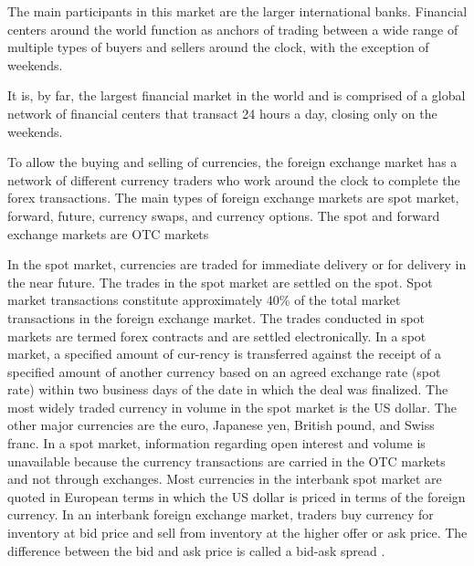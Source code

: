 The main participants in this market are the larger international banks. Financial centers around the world function as anchors of trading between a wide range of multiple types of buyers and sellers around the clock, with the exception of weekends.

It is, by far, the largest financial market in the world and is comprised of a global network of financial centers that transact 24 hours a day, closing only on the weekends.

To allow the buying and selling of currencies, the foreign exchange market has a network of different currency  traders  who  work  around  the  clock  to  complete  the  forex  transactions.  The  main  types  of  foreign exchange markets are spot market, forward, future, currency swaps, and currency options. The spot and forward exchange markets are OTC markets

In the spot market, currencies are traded for immediate delivery or for delivery in the near future. The trades in the spot market are settled on the spot. Spot market transactions constitute approximately 40\% of the total market transactions in the foreign exchange market. The trades conducted in spot markets are termed forex contracts and are settled electronically. In a spot market, a specified amount of cur-rency is transferred against the receipt of a specified amount of another currency based on an agreed exchange rate (spot rate) within two business days of the date in which the deal was finalized. The most widely traded currency in volume in the spot market is the US dollar. The other major currencies are the euro, Japanese yen, British pound, and Swiss franc. In a spot market, information regarding open interest and volume is unavailable because the currency transactions are carried in the OTC markets and not through exchanges. Most currencies in the interbank spot market are quoted in European terms in  which  the  US  dollar  is  priced  in  terms  of  the  foreign  currency.  In  an  interbank  foreign  exchange  market, traders buy currency for inventory at bid price and sell from inventory at the higher offer or ask price. The difference between the bid and ask price is called a bid-ask spread \cite{book_forex}.

